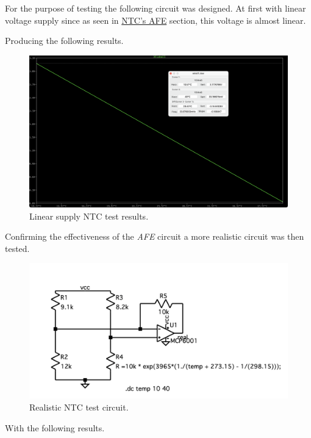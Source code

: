 \documentclass[12pt]{article}
\begin{document}
    For the purpose of testing the following circuit was designed.
    At first with linear voltage supply since as seen in \hyperref[AFENTC]{NTC's AFE} section, this voltage is almost linear.

    Producing the following results.
 
    \begin{figure}[H] 
        \centering
        \includegraphics*[scale = 0.3]{images/NTCLinearRes.png}
        \caption{Linear supply NTC test results.}
        \label{wrap-fig:1}
    \end{figure}

    Confirming the effectiveness of the \textit{AFE} circuit a more realistic
    circuit was then tested.

    \begin{figure}[H] 
        \centering
        \includegraphics*[scale = 0.6]{images/NTCRealTb.png}
        \caption{Realistic NTC test circuit.}
        \label{wrap-fig:1}
    \end{figure}
    
    With the following results.
    
\end{document}
